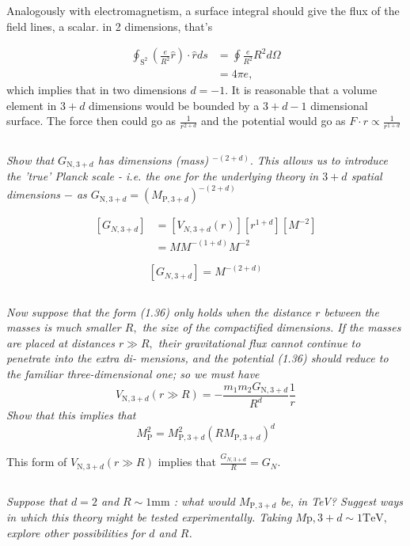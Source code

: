 \documentclass{article}
\begin{document}
Analogously with electromagnetism, a surface integral should give the flux of the field lines, a scalar. in 2 dimensions, that's 

\begin{align*}
    \oint_{\mathrm{S^2}}\left(\frac{e}{R^{2}} \hat{r}\right) \cdot \hat{r} d s &=\oint \frac{e}{R^{2}} R^{2} d \Omega\\
    &= 4 \pi e,
\end{align*}
which implies that in two dimensions $d = -1$. It is reasonable that a volume element in $3+d$ dimensions would be bounded by a $3 + d - 1$ dimensional surface. The force then could go as $\frac{1}{r^{2+d}}$ and the potential would go as $F \cdot r \propto \frac{1}{r^{1+d}}$

\subsection{}
\textit{Show that $G_{\mathrm{N}, 3+d}$ has dimensions (mass) $^{-(2+d)} .$ This allows us to introduce the 'true' Planck scale - i.e. the one for the underlying theory in $3+d$ spatial dimensions $-$ as $G_{\mathrm{N}, 3+d}=\left(M_{\mathrm{P}, 3+d}\right)^{-(2+d)}$}

\begin{align*}
    \left[G_{N, 3 + d}\right]&=\left[V_{N, 3+d}(r)\right]\left[r^{1+d}\right]\left[M^{-2}\right]\\
    &=M M^{-(1+d)} M^{-2}
\end{align*}

$$\boxed{\left[G_{N, 3 + d}\right] = M^{-(2 + d)}}$$

\subsection{}
\textit{Now suppose that the form (1.36) only holds when the distance $r$ between the masses is much smaller $R,$ the size of the compactified dimensions. If the masses are placed at distances $r \gg R,$ their gravitational flux cannot continue to penetrate into the extra di- mensions, and the potential (1.36) should reduce to the familiar three-dimensional one; so we must have
$$
V_{\mathrm{N}, 3+d}(r \gg R)=-\frac{m_{1} m_{2} G_{\mathrm{N}, 3+d}}{R^{d}} \frac{1}{r}
$$
Show that this implies that
$$
M_{\mathrm{P}}^{2}=M_{\mathrm{P}, 3+d}^{2}\left(R M_{\mathrm{P}, 3+d}\right)^{d}
$$}

This form of $V_{\mathrm{N}, 3+d}(r \gg R)$ implies that $\frac{G_{N, 3+d}}{R}=G_{N}$.
\subsection{}
\textit{Suppose that $d=2$ and $R \sim 1 \mathrm{mm}$ : what would $M_{\mathrm{P}, 3+d}$ be, in TeV? Suggest ways in which this theory might be tested experimentally. Taking $M \mathrm{p}, 3+d \sim 1 \mathrm{TeV},$ explore other possibilities for $d$ and $R$.}
\end{document}
